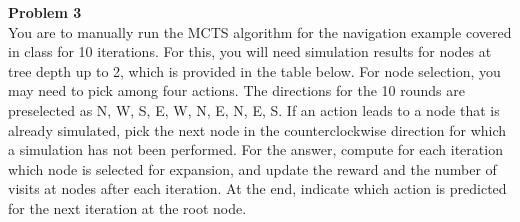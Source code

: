 \documentclass{article}
\newenvironment{problem}[2][Problem]
    { \begin{mdframed}[backgroundcolor=gray!20] \textbf{#1 #2} \\}
    {  \end{mdframed}}
\begin{document}
\begin{problem}{3}
You are to manually run the MCTS algorithm for the navigation example covered in class for 10
iterations. For this, you will need simulation results for
nodes at tree depth up to 2, which is provided in the table
below. For node selection, you may need to pick among
four actions. The directions for the 10 rounds are preselected as N, W, S, E, W, N, E, N, E, S. If an action leads
to a node that is already simulated, pick the next node in
the counterclockwise direction for which a simulation has
not been performed.
For the answer, compute for each iteration which node is
selected for expansion, and update the reward and the number of visits at nodes after each iteration. At the end, indicate which action is predicted for the
next iteration at the root node.
\end{problem}
\end{document}

